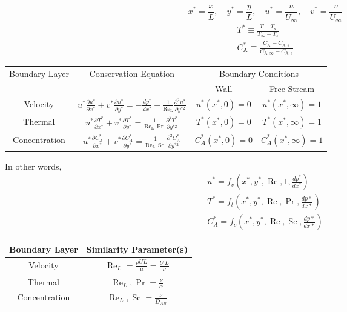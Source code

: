 \[
x^* = \frac{x}{L}, \quad y^* = \frac{y}{L}, \quad u^* = \frac{u}{U_\infty}, \quad v^* = \frac{v}{U_\infty}
\]
%
\[
    \begin{gathered}
    T^* \equiv \frac{T-T_s}{T_{\infty}-T_s} 
    \\[1em]
    C_{\mathrm{A}}^* \equiv \frac{C_{\mathrm{A}}-C_{\mathrm{A}, s}}{C_{\mathrm{A}, \infty}-C_{\mathrm{A}, s}}
    \end{gathered}
\]
%
\begin{table}[H]
\centering
\renewcommand{\arraystretch}{3.0}  %
\begin{tabular}{|c|c|cc|}
\hline
\multirow{2}{*}{Boundary Layer} & \multirow{2}{*}{Conservation Equation} & \multicolumn{2}{c|}{Boundary Conditions} 
\\
\cline{3-4}
 &  & Wall & Free Stream 
 \\
\hline
Velocity & $u^*\frac{\partial u^*}{\partial x^*} + v^*\frac{\partial u^*}{\partial y^*} = -\frac{dp^*}{dx^*} + \frac{1}{\operatorname{Re_L}}\frac{\partial^2 u^*}{\partial y^{*2}}$ & $u^*(x^*,0) = 0$ & $u^*(x^*,\infty) = 1$ 
\\
\hline
Thermal & $u^*\frac{\partial T^*}{\partial x^*} + v^*\frac{\partial T^*}{\partial y^*} = \frac{1}{\operatorname{Re_L} \,\operatorname{Pr}}\frac{\partial^2 T^*}{\partial y^{*2}}$ & $T^*(x^*,0) = 0$ & $T^*(x^*,\infty) = 1$ 
\\
\hline
Concentration & $u^*\frac{\partial C_A^*}{\partial x^*} + v^*\frac{\partial C_A^*}{\partial y^*} = \frac{1}{\operatorname{Re_L}\, \operatorname{Sc}}\frac{\partial^2 C_A^*}{\partial y^{*2}}$ & $C_A^*(x^*,0) = 0$ & $C_A^*(x^*,\infty) = 1$ 
\\
\hline
\end{tabular}
\end{table}
%
In other words,
\[
    \begin{array}{l}
         u^* = f_v\left(x^*,y^*,\operatorname{Re}, 1, \frac{dp^*}{dx^*}\right)  
         \\[1em]
         T^* = f_t\left(x^*,y^*,\operatorname{Re}, \operatorname{Pr}, \frac{dp*}{dx*}\right) 
         \\[1em]
         C^*_A = f_c\left(x^*,y^*,\operatorname{Re}, \operatorname{Sc}, \frac{dp*}{dx*}\right)          
    \end{array}
\]
%
\begin{table}[H]
    \centering
    \renewcommand{\arraystretch}{3}  %
    \begin{tabular}{|c|c|}
    \hline
    Boundary Layer & Similarity Parameter(s) \\
    \hline
    Velocity & $\operatorname{Re}_L = \frac{\rho U L}{\mu}=\frac{U\, L}{\nu}$ \\
    \hline
    Thermal & $\operatorname{Re}_L, \operatorname{Pr} = \frac{\nu}{\alpha}$ \\
    \hline
    Concentration & $\operatorname{Re}_L, \operatorname{Sc} = \frac{\nu}{D_{AB}}$ \\
    \hline
    \end{tabular}
\end{table}
%
